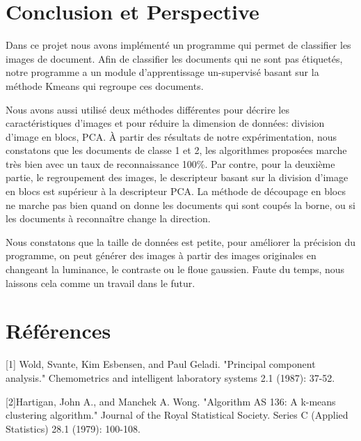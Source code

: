 \documentclass[french,12pt,a4paper,oneside,notitlepage]{report}
\begin{document}
\section{Conclusion et Perspective}
Dans ce projet nous avons implémenté un programme qui permet de classifier les images de document. Afin de classifier  les documents qui ne sont pas étiquetés, notre programme a un module d'apprentissage un-supervisé basant sur la méthode Kmeans qui regroupe ces documents. 

Nous avons aussi utilisé deux méthodes différentes pour décrire les caractéristiques d'images et pour réduire la dimension de données: division d'image en blocs, PCA.
À partir des résultats de notre expérimentation, nous constatons que les documents de classe 1 et 2, les algorithmes proposées marche très bien avec un taux de reconnaissance 100\%. Par contre, pour la deuxième partie, le regroupement des images, le descripteur basant sur la division d'image en blocs est supérieur à la descripteur PCA. 
La méthode de découpage en blocs ne marche pas bien quand on donne les documents qui sont coupés la borne, ou si les documents à reconnaître change la direction.

Nous constatons que la taille de données est petite, pour améliorer la précision du programme, on peut générer des images à partir des images originales en changeant la luminance, le contraste ou le floue gaussien. Faute du temps, nous laissons cela comme un travail dans le futur.
\pagebreak
\section*{Références}
[1] Wold, Svante, Kim Esbensen, and Paul Geladi. "Principal component analysis." 
Chemometrics and intelligent laboratory systems 2.1 (1987): 37-52.

[2]Hartigan, John A., and Manchek A. Wong. "Algorithm AS 136: A k-means clustering algorithm." Journal of the Royal Statistical Society. Series C (Applied Statistics) 28.1 (1979): 100-108.
\end{document}
